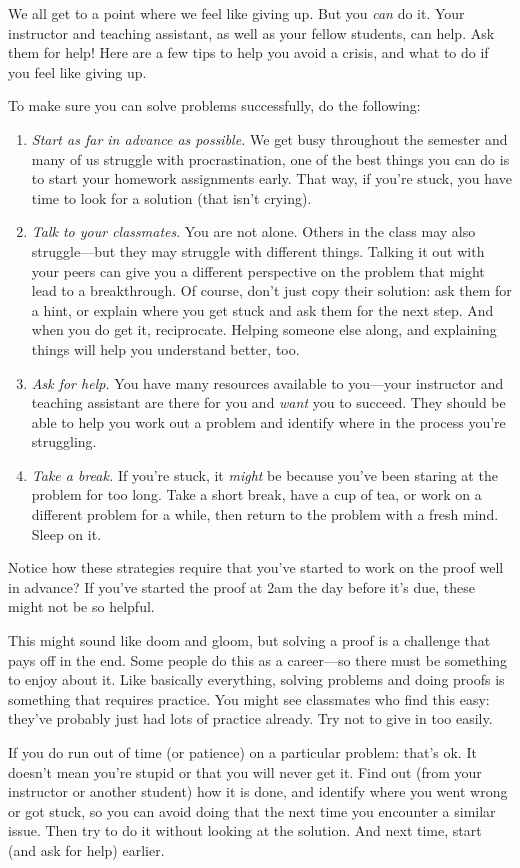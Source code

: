 \documentclass[../../../include/open-logic-section]{subfiles}
\begin{document}


We all get to a point where we feel like giving up. But you \emph{can}
do it. Your instructor and teaching assistant, as well as your fellow
students, can help. Ask them for help!{}  Here are a few tips to help
you avoid a crisis, and what to do if you feel like giving up.

To make sure you can solve problems successfully, do the
following:
\begin{enumerate}
\item \emph{Start as far in advance as possible.} We get busy
  throughout the semester and many of us struggle with
  procrastination, one of the best things you can do is to start your
  homework assignments early. That way, if you're stuck, you have time
  to look for a solution (that isn't crying).
\item \emph{Talk to your classmates}.  You are not alone. Others in
  the class may also struggle---but they may struggle with different
  things. Talking it out with your peers can give you a different
  perspective on the problem that might lead to a breakthrough.  Of
  course, don't just copy their solution: ask them for a hint, or
  explain where you get stuck and ask them for the next step. And when
  you do get it, reciprocate. Helping someone else along, and
  explaining things will help you understand better, too.
\item \emph{Ask for help.} You have many resources available to
  you---your instructor and teaching assistant are there for you and
  \emph{want} you to succeed. They should be able to help you work out
  a problem and identify where in the process you're struggling.
\item \emph{Take a break.} If you're stuck, it \emph{might} be because
  you've been staring at the problem for too long. Take a short break,
  have a cup of tea, or work on a different problem for a while, then
  return to the problem with a fresh mind. Sleep on it.
\end{enumerate}

Notice how these strategies require that you've started to work on the
proof well in advance? If you've started the proof at 2am the day
before it's due, these might not be so helpful.

This might sound like doom and gloom, but solving a proof is a
challenge that pays off in the end. Some people do this as a
career---so there must be something to enjoy about it. Like basically
everything, solving problems and doing proofs is something that
requires practice.  You might see classmates who find this easy:
they've probably just had lots of practice already.  Try not to give
in too easily.

If you do run out of time (or patience) on a particular problem:
that's ok. It doesn't mean you're stupid or that you will never get
it. Find out (from your instructor or another student) how it is done,
and identify where you went wrong or got stuck, so you can avoid doing
that the next time you encounter a similar issue.  Then try to do it
without looking at the solution.  And next time, start (and ask for
help) earlier.
\end{document}
